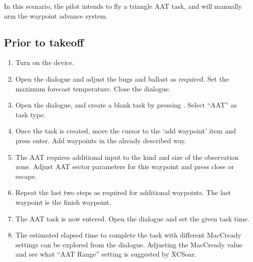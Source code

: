 In this scenario, the pilot intends to fly a triangle AAT task, and
will manually arm the waypoint advance system.

\subsection*{Prior to takeoff}
\begin{enumerate}
\item  Turn on the device.
\item  Open the  dialogue and adjust the bugs and ballast as
  required. Set the maximum forecast temperature.  Close the dialogue.
\item Open the  dialogue, and create a blank task by pressing
. Select ``AAT'' as task type.
\item  Once the task is created, move the cursor to the `add waypoint' item
  and press enter.  Add waypoints in the already described way. 
\item  The AAT requires additional input to the kind and size of the
  observation zone. Adjust AAT sector parameters for this waypoint and press
  close or escape.
\item  Repeat the last two steps as required for additional waypoints.  The last
  waypoint is the finish waypoint.
\item  The AAT task is now entered.  Open the  dialogue
  and set the given task time. 
\item  The estimated elapsed time to complete the task with different MacCready
  settings can be explored from the  dialogue.  Adjusting the 
  MacCready value and see what ``AAT Range'' setting is suggested by XCSoar.
\end{enumerate}

